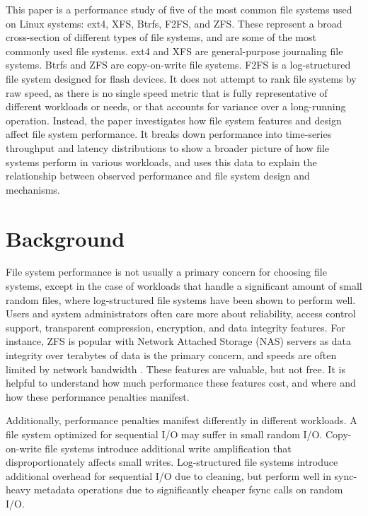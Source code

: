 \documentclass[letterpaper,twocolumn,10pt]{article}
\begin{document}
This paper is a performance study of five of the most common file systems used on Linux systems: ext4, XFS, Btrfs, F2FS, and ZFS. These represent a broad cross-section of different types of file systems, and are some of the most commonly used file systems. ext4 and XFS are general-purpose journaling file systems. Btrfs and ZFS are copy-on-write file systems. F2FS is a log-structured file system designed for flash devices. It does not attempt to rank file systems by raw speed, as there is no single speed metric that is fully representative of different workloads or needs, or that accounts for variance over a long-running operation. Instead, the paper investigates how file system features and design affect file system performance. It breaks down performance into time-series throughput and latency distributions to show a broader picture of how file systems perform in various workloads, and uses this data to explain the relationship between observed performance and file system design and mechanisms.

\section{Background}
File system performance is not usually a primary concern for choosing file systems, except in the case of workloads that handle a significant amount of small random files, where log-structured file systems have been shown to perform well. Users and system administrators often care more about reliability, access control support, transparent compression, encryption, and data integrity features. For instance, ZFS is popular with Network Attached Storage (NAS) servers as data integrity over terabytes of data is the primary concern, and speeds are often limited by network bandwidth \cite{truenas-zfs}. These features are valuable, but not free. It is helpful to understand how much performance these features cost, and where and how these performance penalties manifest.

Additionally, performance penalties manifest differently in different workloads. A file system optimized for sequential I/O may suffer in small random I/O. Copy-on-write file systems introduce additional write amplification that disproportionately affects small writes. Log-structured file systems introduce additional overhead for sequential I/O due to cleaning, but perform well in sync-heavy metadata operations due to significantly cheaper fsync calls on random I/O.
\end{document}
